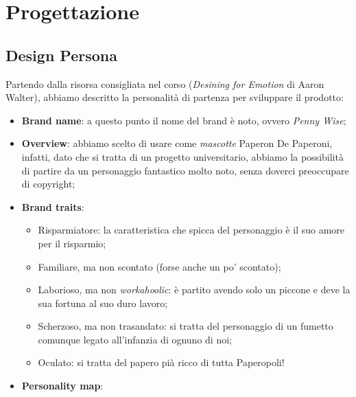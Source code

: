 \section{Progettazione}

\subsection{Design Persona}

Partendo dalla risorsa consigliata nel corso (\textit{Desining for Emotion} di Aaron Walter), abbiamo descritto la personalità di partenza per sviluppare il prodotto:
\begin{itemize}
    \item \textbf{Brand name}: a questo punto il nome del brand è noto, ovvero \textit{Penny Wise};

    \item \textbf{Overview}: abbiamo scelto di usare come \textit{mascotte} Paperon De Paperoni, infatti, dato che si tratta di un progetto universitario, abbiamo la possibilità di partire da un personaggio fantastico molto noto, senza doverci preoccupare di copyright;

    \item \textbf{Brand traits}:
        \begin{itemize}
            \item Risparmiatore: la caratteristica che spicca del personaggio è il suo amore per il risparmio;

            \item Familiare, ma non scontato (forse anche un po' scontato);

            \item Laborioso, ma non \textit{workahoolic}: è partito avendo solo un piccone e deve la sua fortuna al suo duro lavoro;

            \item Scherzoso, ma non trasandato: si tratta del personaggio di un fumetto comunque legato all'infanzia di ognuno di noi;

            \item Oculato: si tratta del papero pià ricco di tutta Paperopoli!
        \end{itemize}
    
    \item \textbf{Personality map}:
        \begin{center}
\end{center}
\end{itemize}
